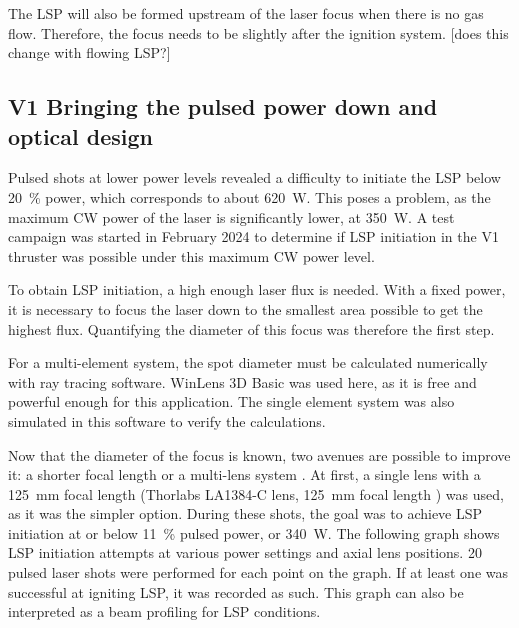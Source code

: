         The LSP will also be formed upstream of the laser focus when there is no gas flow. Therefore, the focus needs to be slightly after the ignition system. [does this change with flowing LSP?]

        

    \subsection{V1 Bringing the pulsed power down and optical design} \label{sec:pulse_power_down_V1}

        Pulsed shots at lower power levels revealed a difficulty to initiate the LSP below \qty{20}{\%} power, which corresponds to about \qty{620}{W}. This poses a problem, as the maximum CW power of the laser is significantly lower, at \qty{350}{W}. A test campaign was started in February 2024 to determine if LSP initiation in the V1 thruster was possible under this maximum CW power level.
        
        To obtain LSP initiation, a high enough laser flux is needed. With a fixed power, it is necessary to focus the laser down to the smallest area possible to get the highest flux. Quantifying the diameter of this focus was therefore the first step. 


        For a multi-element system, the spot diameter must be calculated numerically with ray tracing software. WinLens 3D Basic was used here, as it is free and powerful enough for this application. The single element system was also simulated in this software to verify the calculations.

        Now that the diameter of the focus is known, two avenues are possible to improve it: a shorter focal length or a multi-lens system \cite{LensTutorial}. At first, a single lens with a \qty{125}{mm} focal length (Thorlabs LA1384-C lens, \qty{125}{mm} focal length ) was used, as it was the simpler option. During these shots, the goal was to achieve LSP initiation at or below \qty{11}{\%} pulsed power, or \qty{340}{W}. The following graph shows LSP initiation attempts at various power settings and axial lens positions. 20 pulsed laser shots were performed for each point on the graph. If at least one was successful at igniting LSP, it was recorded as such. This graph can also be interpreted as a beam profiling for LSP conditions.
        
